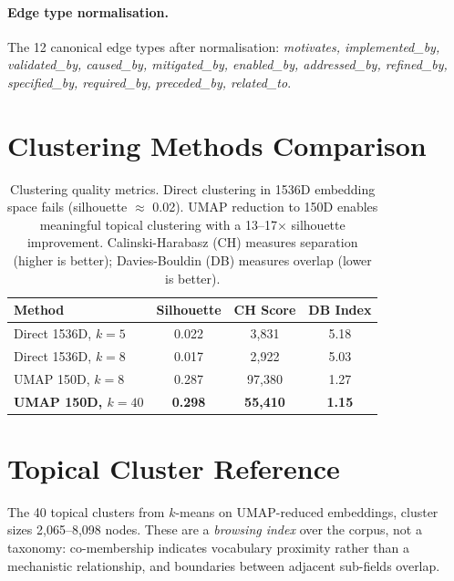 \documentclass[10pt,twocolumn,letterpaper]{article}
\begin{document}
\paragraph{Edge type normalisation.}
The 12 canonical edge types after normalisation:
\textit{motivates, implemented\_by, validated\_by, caused\_by, mitigated\_by,
enabled\_by, addressed\_by, refined\_by, specified\_by, required\_by,
preceded\_by, related\_to}.

\section{Clustering Methods Comparison}
\label{app:clustering}

\begin{table}[h]
\centering
\small
\begin{tabular}{lccc}
\toprule
\textbf{Method} & \textbf{Silhouette} & \textbf{CH Score} & \textbf{DB Index} \\
\midrule
Direct 1536D, $k=5$ & 0.022 & 3,831 & 5.18 \\
Direct 1536D, $k=8$ & 0.017 & 2,922 & 5.03 \\
UMAP 150D, $k=8$ & 0.287 & 97,380 & 1.27 \\
\textbf{UMAP 150D, $k=40$} & \textbf{0.298} & \textbf{55,410} & \textbf{1.15} \\
\bottomrule
\end{tabular}
\caption{Clustering quality metrics. Direct clustering in 1536D embedding space
fails (silhouette $\approx$ 0.02). UMAP reduction to 150D enables meaningful
topical clustering with a 13--17$\times$ silhouette improvement.
Calinski-Harabasz (CH) measures separation (higher is better); Davies-Bouldin
(DB) measures overlap (lower is better).}
\label{tab:clustering-methods}
\end{table}

\section{Topical Cluster Reference}
\label{app:clusters}

The 40 topical clusters from $k$-means on UMAP-reduced embeddings, cluster sizes
2{,}065--8{,}098 nodes. These are a \emph{browsing index} over the corpus, not a
taxonomy: co-membership indicates vocabulary proximity rather than a mechanistic
relationship, and boundaries between adjacent sub-fields overlap.
\end{document}
